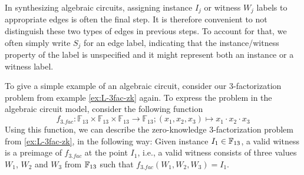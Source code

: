 \begin{notation}
In synthesizing algebraic circuits, assigning instance $I_j$ or witness $W_j$ labels to appropriate edges is often the final step. It is therefore convenient to not distinguish these two types of edges in previous steps. To account for that, we often simply write $S_j$ for an edge label, indicating that the instance/witness property of the label is unspecified and it might represent both an instance or a witness label. 
\end{notation}
\begin{example}
\label{ex:3-fac-zk-circuit} To give a simple example of an algebraic circuit, consider our $3$-factorization problem from example \ref{ex:L-3fac-zk} again.  To express the problem in the algebraic circuit model, consider the following function 
\[
f_{3.fac}:\mathbb{F}_{13}\times\mathbb{F}_{13}\times\mathbb{F}_{13}\to\mathbb{F}_{13};(x_{1},x_{2},x_{3})\mapsto x_{1}\cdot x_{2}\cdot x_{3}
\]
Using this function, we can describe the zero-knowledge $3$-factorization problem from \ref{ex:L-3fac-zk}, in the following way: Given instance $I_1\in \mathbb{F}_{13}$, a valid witness is a preimage of $f_{3.fac}$ at the point $I_1$, i.e., a valid witness consists of three values $W_1$, $W_2$ and $W_3$ from $\mathbb{F}_{13}$ such that $f_{3.fac}(W_1,W_2,W_3)=I_1$. 


\end{example}
